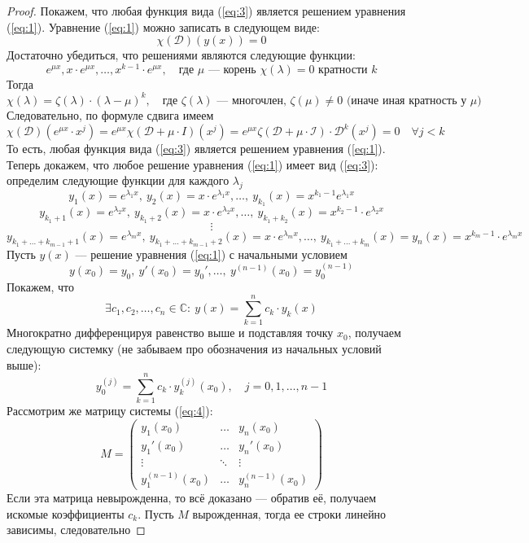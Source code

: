 \documentclass[11pt]{article}
\begin{document}
\begin{proof}
    Покажем, что любая функция вида (\ref{eq:3}) является решением уравнения (\ref{eq:1}). Уравнение (\ref{eq:1}) можно записать в следующем виде:
    \[\chi(\mathcal{D})(y(x)) = 0\] Достаточно убедиться, что решениями являются следующие функции: \[e^{\mu x}, x \cdot e^{\mu x}, \dots, x^{k-1}
    \cdot e^{\mu x}, \quad \text{где } \mu \text{ --- корень } \chi(\lambda) = 0 \text{ кратности } k\]
    Тогда \[\chi(\lambda) = \zeta(\lambda) \cdot (\lambda - \mu)^k, \quad  \text{где } \zeta(\lambda) \text{ --- многочлен, } \zeta(\mu) \neq 0
    \text{ (иначе иная кратность у } \mu)\] Следовательно, по формуле сдвига имеем \[\chi(\mathcal{D})(e^{\mu x} \cdot x^j) = e^{\mu x} 
    \chi(\mathcal{D} + \mu \cdot I)(x^j) = e^{\mu x} \zeta(\mathcal{D + \mu \cdot I}) \cdot \mathcal{D}^k(x^j) = 0 \quad \forall j < k\]
    То есть, любая функция вида (\ref{eq:3}) является решением уравнения (\ref{eq:1}). \\ 
    Теперь докажем, что любое решение уравнения (\ref{eq:1}) имеет вид (\ref{eq:3}): определим следующие функции для каждого $\lambda_j$
    \[y_1(x) = e^{\lambda_1 x}, \ y_2(x) = x \cdot e^{\lambda_1 x}, \dots, \ y_{k_1} (x) = x^{k_1 - 1} e^{\lambda_1 x}\]
    \[y_{k_1 + 1}(x) = e^{\lambda_2 x},\  y_{k_1 + 2}(x) = x \cdot e^{\lambda_2 x}, \dots, \ y_{k_1 + k_2}(x) = x^{k_2 - 1} \cdot e^{\lambda_2 x}\]
    \[\vdots\] \[y_{k_1+...+k_{m-1}+1}(x) = e^{\lambda_m x}, \ y_{k_1+...+k_{m-1}+2}(x) = x \cdot e^{\lambda_m x}, \dots, 
    \ y_{k_1+...+k_m}(x) = y_n(x) = x^{k_m - 1} \cdot e^{\lambda_m x}\]
    Пусть $y(x)$ --- решение уравнения (\ref{eq:1}) с начальными условием \[y(x_0) = y_0, \ y'(x_0) = y_0', \dots, \ y^{(n-1)}(x_0) = y_0^{(n-1)}\]
    Покажем, что \[\exists c_1, c_2, \dots, c_n \in \mathbb{C}: \ y(x) = \sum_{k = 1}^{n} c_k \cdot y_k(x)\] 
    Многократно дифференцируя равенство выше и подставляя точку $x_0$, получаем следующую системку (не забываем про обозначения из начальных условий выше):
    \[y_0^{(j)} = \sum_{k = 1}^{n} c_k \cdot y_k^{(j)}(x_0), \quad j = 0, 1, \dots, n-1 \tag{4} \label{eq:4}\]
    Рассмотрим же матрицу системы (\ref{eq:4}): \[M = \begin{pmatrix}
        y_1(x_0) & \dots & y_n(x_0) \\ y_1'(x_0) & \dots & y_n'(x_0) \\ \vdots & \ddots & \vdots \\ y_1^{(n-1)}(x_0) & \dots & y_n^{(n-1)} (x_0)
    \end{pmatrix}\]
    Если эта матрица невырожденна, то всё доказано --- обратив её, получаем искомые коэффициенты $c_k$. Пусть $M$ вырожденная, тогда ее строки линейно зависимы, следовательно 

\end{proof}
\end{document}
